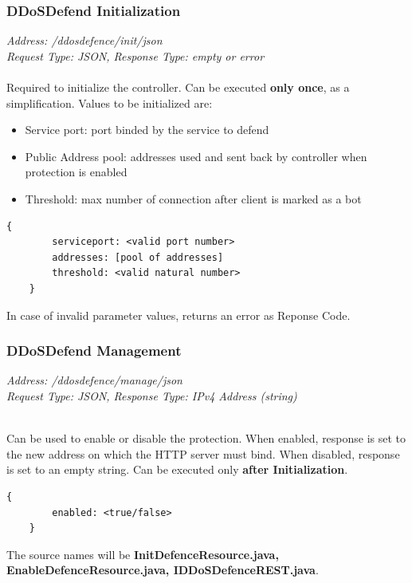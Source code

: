 \subsubsection{DDoSDefend Initialization}
\textit{Address: /ddosdefence/init/json\\
Request Type: JSON, Response Type: empty or error\\\\}
Required to initialize the controller. Can be executed \textbf{only once}, as a simplification.
Values to be initialized are:
\begin{itemize}
	\item Service port: port binded by the service to defend
	\item Public Address pool: addresses used and sent back by controller when protection is enabled
	\item Threshold: max number of connection after client is marked as a bot
\end{itemize}

\begin{lstlisting}[caption={DDoSDefend Initialization Request format/example},captionpos=b]
	{
		serviceport: <valid port number>
		addresses: [pool of addresses]
		threshold: <valid natural number>
	}
\end{lstlisting}

In case of invalid parameter values, returns an error as Reponse Code.

\subsubsection{DDoSDefend Management}
\textit{Address: /ddosdefence/manage/json\\
Request Type: JSON, Response Type: IPv4 Address (string)\\\\}

Can be used to enable or disable the protection. When enabled, response is set to the new address on which the HTTP server must bind. When disabled, response is set to an empty string. Can be executed only \textbf{after Initialization}.

\begin{lstlisting}[caption={DDoSDefend Management Request format/example},captionpos=b]
	{
		enabled: <true/false>
	}
\end{lstlisting}

The source names will be \textbf{InitDefenceResource.java, EnableDefenceResource.java, IDDoSDefenceREST.java}.


